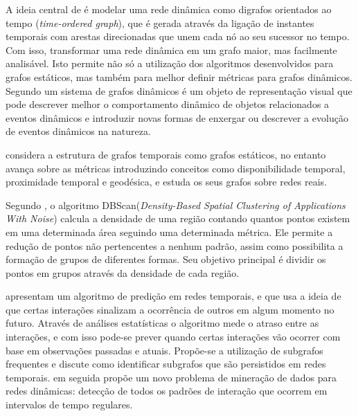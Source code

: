A ideia central de \cite{kim} é modelar uma rede dinâmica como digrafos orientados ao
tempo (\textit{time-ordered graph}), que é gerada através da ligação de instantes temporais com arestas
direcionadas que unem cada nó ao seu sucessor no tempo. Com isso, transformar uma rede dinâmica
em um grafo maior, mas facilmente analisável. Isto permite não só a utilização dos algoritmos 
desenvolvidos para grafos estáticos, mas também para melhor definir métricas para grafos dinâmicos.
Segundo \cite{kim} um sistema de grafos dinâmicos é um objeto de representação visual
que pode descrever melhor o comportamento dinâmico de objetos relacionados a eventos dinâmicos e
introduzir novas formas de enxergar ou descrever a evolução de eventos dinâmicos na natureza.

\cite{kostakos} considera a estrutura de grafos temporais como grafos
estáticos, no entanto avança sobre as métricas introduzindo conceitos como disponibilidade
temporal, proximidade temporal e geodésica, e estuda os seus grafos sobre redes reais.

Segundo \cite{density-based-clusters}, o algoritmo DBScan(\textit{Density-Based Spatial Clustering
of Applications With Noise}) calcula a densidade de uma região contando quantos pontos existem
em uma determinada área seguindo uma determinada métrica. Ele permite a redução de pontos não
pertencentes a nenhum padrão, assim como possibilita a formação de grupos de diferentes formas.
Seu objetivo principal é dividir os pontos em grupos através da densidade de cada região.

\cite{lahiri2007} apresentam um algoritmo de predição em redes temporais, e que usa a ideia de que certas
interações sinalizam a ocorrência de outros em algum momento no futuro. Através de análises estatísticas
o algoritmo mede o atraso entre as interações, e com isso pode-se prever quando certas interações vão ocorrer
com base em observações passadas e atuais. Propõe-se a utilização de subgrafos frequentes e discute
como identificar subgrafos que são persistidos em redes temporais.
\cite{lahiri2008} em seguida propõe um novo problema de mineração de dados para redes dinâmicas:
detecção de todos os padrões de interação que ocorrem em intervalos de tempo regulares.












